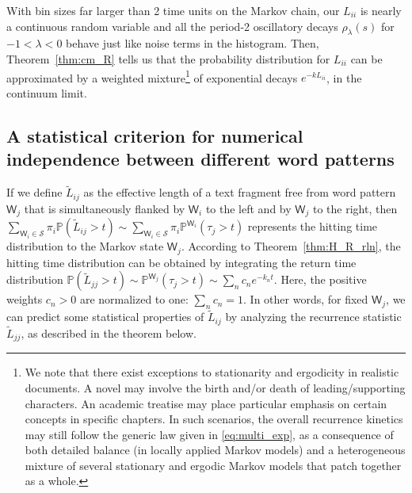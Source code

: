 \documentclass[10pt,journal,compsoc]{IEEEtran}
\begin{document}
With bin sizes  far larger than 2 time units on the Markov chain, our $ L_{ii}$ is nearly a continuous random variable and all the period-2 oscillatory decays $ \rho_\lambda(s)$ for $ -1<\lambda<0$ behave just like noise terms in the histogram. Then, Theorem~\ref{thm:cm_R} tells us that the probability distribution for $ L_{ii}$ can be  approximated by  a  weighted  mixture\footnote{We note that there exist exceptions to stationarity and ergodicity in realistic documents. A novel may involve the birth and/or death of leading/supporting characters. An academic treatise may place particular emphasis on certain concepts in specific chapters. In such scenarios, the overall  recurrence kinetics may still follow the generic law given in   \eqref{eq:multi_exp}, as a consequence of both detailed balance (in locally applied Markov models) and a heterogeneous mixture of several stationary and ergodic Markov models that patch together as a whole.
 }  of exponential decays $ e^{-kL_{ii}}$, in the continuum limit.\subsection{A statistical criterion for numerical independence between different word patterns\label{app:sigm}
}If we define $\widetilde L_{ij} $ as the effective length of a text fragment free from word  pattern $\mathsf W_j$ that is simultaneously flanked by $\mathsf W_i$ to the left and by $\mathsf W_j$ to the right, then $ \sum_{\mathsf W_i\in\mathscr S}\pi_i\mathbb P(\widetilde L_{ij}>t)\sim \sum_{\mathsf W_i\in\mathscr S}\pi_i\mathbb P^{\mathsf W_i}(\tau_{j}>t)$ represents the hitting time distribution to the Markov state $\mathsf W_j$. According to Theorem~\ref{thm:H_R_rln}, the hitting time distribution can be obtained by integrating the return time distribution $ \mathbb P(\widetilde L_{jj}>t)\sim \mathbb P^{\mathsf W_j}(\tau_j>t)\sim \sum_nc_ne^{-k_nt}$. Here, the positive weights $c_n>0$ are normalized to one: $ \sum_nc_n=1$. In other words, for fixed $\mathsf W_j$, we can predict some statistical properties of $\widetilde L_{ij} $ by analyzing the recurrence statistic $ \widetilde L_{jj}$, as described in the theorem below.
\end{document}
